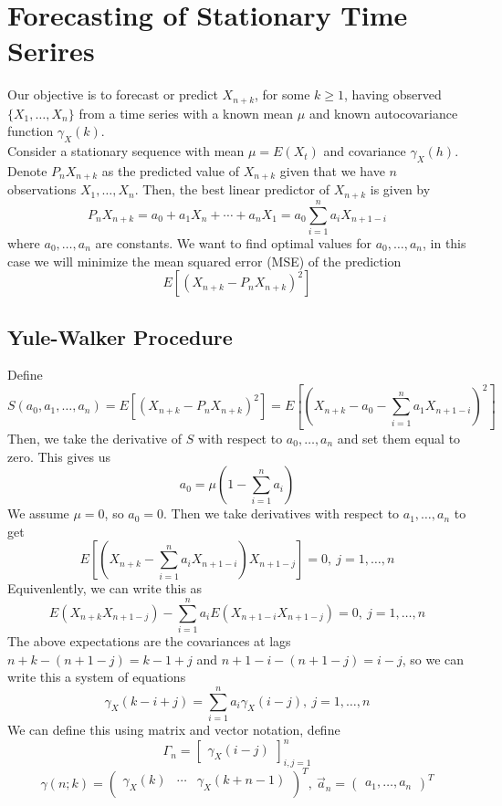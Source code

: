 \chapter{Forecasting of Stationary Time Serires}

Our objective is to forecast or predict $X_{n+k}$, for some $k\geq1$, having observed $\{X_1,\ldots,X_n\}$ from a time series with a known mean $\mu$ and known autocovariance function $\gamma_X(k)$.\\

Consider a stationary sequence with mean $\mu = E(X_t)$ and covariance $\gamma_X(h)$. Denote $P_nX_{n+k}$ as the predicted value of $X_{n+k}$ given that we have $n$ observations $X_1,\ldots,X_n$. Then, the best linear predictor of $X_{n+k}$ is given by
\[P_nX_{n+k} = a_0 + a_1X_n + \cdots + a_nX_1 = a_0 \sum_{i=1}^n a_iX_{n+1-i}\]
where $a_0,\ldots,a_n$ are constants. We want to find optimal values for $a_0,\ldots,a_n$, in this case we will minimize the mean squared error (MSE) of the prediction
\[E\left[(X_{n+k} - P_nX_{n+k})^2\right]\]

\section{Yule-Walker Procedure}

Define 
\[S(a_0,a_1, \ldots, a_n) = E\left[(X_{n+k}-P_nX_{n+k})^2\right] = E\left[\left(X_{n+k} - a_0 - \sum_{i=1}^n a_1X_{n+1-i}\right)^2\right]\]
Then, we take the derivative of $S$ with respect to $a_0,\ldots,a_n$ and set them equal to zero. This gives us 
\[a_0 = \mu\left(1-\sum_{i=1}^n a_i\right)\]
We assume $\mu = 0$, so $a_0 = 0$. Then we take derivatives with respect to $a_1,\ldots,a_n$ to get 
\[E\left[\left(X_{n+k}-\sum_{i=1}^na_iX_{n+1-i}\right)X_{n+1-j}\right] = 0, \ j=1,\ldots,n\]
Equivenlently, we can write this as
\[E(X_{n+k}X_{n+1-j}) - \sum_{i=1}^n a_iE(X_{n+1-i}X_{n+1-j}) = 0, \ j = 1,\ldots, n\]
The above expectations are the covariances at lags $n+k - (n+1-j) = k-1+j$ and $n+1-i-(n+1-j) = i-j$, so we can write this a system of equations
\[\gamma_X(k-i+j) = \sum_{i=1}^na_i\gamma_X(i-j), \ j = 1,\ldots, n\]
We can define this using matrix and vector notation, define 
\[\Gamma_n = \begin{bmatrix}\gamma_X(i-j)\end{bmatrix}^n_{i,j=1}\]
\[\gamma(n;k) = \begin{pmatrix}
 \gamma_X(k) & \cdots & \gamma_X(k+n-1) \\
\end{pmatrix}^T, \ \vec{a}_n = \begin{pmatrix}
    a_1, \ldots, a_n
\end{pmatrix}^T\]

